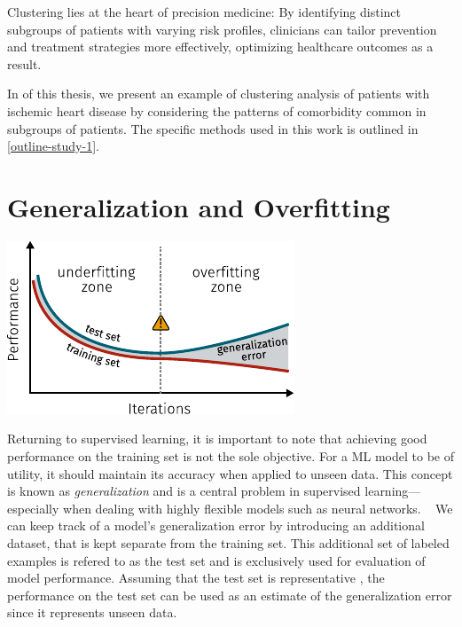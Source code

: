 Clustering lies at the heart of precision medicine:
By identifying distinct subgroups of patients with varying risk profiles, 
clinicians can tailor prevention and treatment strategies more effectively, 
optimizing healthcare outcomes as a result.

In \studyi{} of this thesis,
we present an example of clustering analysis of patients with 
ischemic heart disease by considering the patterns of comorbidity 
common in subgroups of patients.
The specific methods used in this work is outlined 
in \cref{outline-study-1}.

\section{Generalization and Overfitting}
\label{overfitting}

\begin{marginfigure}[3em]
    \centering
	\includegraphics{graphics/overfitting-2}
    \caption[Overfitting as Function of Number of Epochs]{%
        Training a neural network model for many iterations 
        runs the risk of overfitting the model to the training data.
        Although the training error keeps decreasing, 
        it happens at the expense of increased generalization error.
        Inspired by \cite{goodfellow2016deep}.
    }
    \label{fig:generalization-error}
\end{marginfigure}

Returning to supervised learning,
it is important to note that achieving good performance on the 
training set is not the sole objective.
For a \ac{ML} model to be of utility, 
it should maintain its accuracy
when applied to unseen data.
This concept is known as \textit{generalization} and
is a central problem in supervised learning---%
especially when dealing with highly flexible models 
such as neural networks.
~\autocite{goodfellow2016deep}
We can keep track of a model's generalization error 
by introducing an additional dataset, 
that is kept separate from the training set. 
This additional set of labeled examples is refered to as the test set
and is exclusively used for evaluation of model performance.
Assuming that the test set is representative%
\sidenote{%
    An underlying assumption is that the two datasets are 
    independent and identically distributed 
    (typically abbreviated as i.i.d.),
    and thus share the same underlying \textit{data-generating process}.
    [\cite{goodfellow2016deep}]
},
the performance on the test set can be used as an estimate of 
the generalization error since it represents unseen data.


